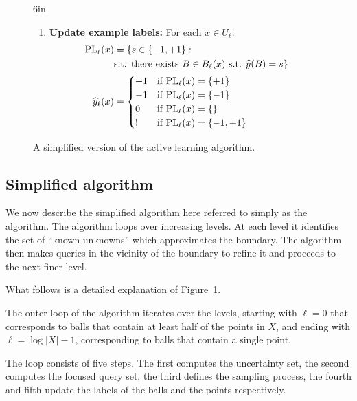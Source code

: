 \documentclass[twoside]{article}
\def\yh{{\widehat{y}}}
\def\PL{{\mbox{\rm PL}}}
\begin{document}
\begin{figure}[t]{6in}
{\begin{minipage}[t]{6in}
\begin{center}
\begin{enumerate}[leftmargin=0.6cm]
\item \label{step:examples} {\bf Update example labels:} For each $x \in U_\ell$:
  \begin{align}
    \PL_\ell(x) &= \{s \in \{-1, +1\}: \\
               & \text{s.t. there exists } B \in B_\ell(x) \text{ s.t. } \yh(B) = s \} \\ 
    \yh_\ell(x) &= 
                  \begin{cases}
                    +1 & \text{if } \PL_\ell(x) = \{+1\} \\
                    -1 & \text{if } \PL_\ell(x) = \{-1\} \\
                    0  & \text{if } \PL_\ell(x) = \{\} \\
                    !  & \text{if } \PL_\ell(x) = \{-1,+1\}
                  \end{cases}
                  \label{eq:provisional-label}
  \end{align}
\end{enumerate}
\end{center}

\end{minipage}}
\caption{A simplified version of the active learning algorithm.}
\label{alg:simple}
\end{figure}

\subsection{Simplified algorithm}

We now describe the simplified algorithm here referred to simply as
the algorithm. The algorithm loops over increasing levels.  At each
level it identifies the set of ``known unknowns'' which approximates
the boundary. The algorithm then makes queries in the vicinity of the
boundary to refine it and proceeds to the next finer level.

What follows is a detailed explanation of  Figure~\ref{alg:simple}.

The outer loop of the algorithm iterates over the
levels, starting with $\ell=0$ that corresponds to balls that contain
at least half of the points in $X$, and ending with $\ell=\log |X|-1$,
corresponding to balls that contain a single point.

The loop consists of five steps. The first computes the uncertainty set, the second computes the focused query
set, the third defines the sampling process, the fourth and fifth
update the labels of the balls and the points respectively.
\end{document}
